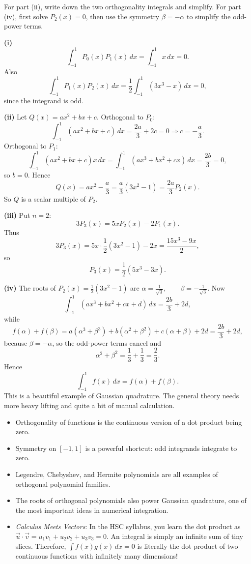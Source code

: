 \begin{hintbox}
For part (ii), write down the two orthogonality integrals and simplify. For part (iv), first solve $P_2(x)=0$, then use the symmetry $\beta=-\alpha$ to simplify the odd-power terms.
\end{hintbox}

\begin{solution}
\textbf{(i)} 
\[
\int_{-1}^{1}P_0(x)P_1(x)\,dx=\int_{-1}^{1}x\,dx=0.
\]
Also
\[
\int_{-1}^{1}P_1(x)P_2(x)\,dx
=\frac12\int_{-1}^{1}(3x^3-x)\,dx=0,
\]
since the integrand is odd.

\textbf{(ii)} Let $Q(x)=ax^2+bx+c$.
Orthogonal to $P_0$:
\[
\int_{-1}^{1}(ax^2+bx+c)\,dx=\frac{2a}{3}+2c=0
\Rightarrow c=-\frac{a}{3}.
\]
Orthogonal to $P_1$:
\[
\int_{-1}^{1}(ax^2+bx+c)x\,dx=\int_{-1}^{1}(ax^3+bx^2+cx)\,dx=\frac{2b}{3}=0,
\]
so $b=0$. Hence
\[
Q(x)=ax^2-\frac{a}{3}=\frac{a}{3}(3x^2-1)=\frac{2a}{3}P_2(x).
\]
So $Q$ is a scalar multiple of $P_2$.

\textbf{(iii)} Put $n=2$:
\[
3P_3(x)=5xP_2(x)-2P_1(x).
\]
Thus
\[
3P_3(x)=5x\cdot \frac12(3x^2-1)-2x=\frac{15x^3-9x}{2},
\]
so
\[
\boxed{P_3(x)=\frac12(5x^3-3x).}
\]

\textbf{(iv)} The roots of $P_2(x)=\frac12(3x^2-1)$ are 
$\alpha=\frac{1}{\sqrt3},\qquad \beta=-\frac{1}{\sqrt3}.$
Now
\[
\int_{-1}^{1}(ax^3+bx^2+cx+d)\,dx=\frac{2b}{3}+2d,
\]
while
\[
f(\alpha)+f(\beta)
=a(\alpha^3+\beta^3)+b(\alpha^2+\beta^2)+c(\alpha+\beta)+2d
=\frac{2b}{3}+2d,
\]
because $\beta=-\alpha$, so the odd-power terms cancel and
\[
\alpha^2+\beta^2=\frac13+\frac13=\frac23.
\]
Hence
\[
\boxed{\int_{-1}^{1} f(x)\,dx=f(\alpha)+f(\beta).}
\]
This is a beautiful example of Gaussian quadrature. The general theory needs more heavy lifting and quite a bit of manual calculation.
\end{solution}

\begin{takeaways}
\begin{itemize}[leftmargin=*]
\item Orthogonality of functions is the continuous version of a dot product being zero.
\item Symmetry on $[-1,1]$ is a powerful shortcut: odd integrands integrate to zero.
\item Legendre, Chebyshev, and Hermite polynomials are all examples of orthogonal polynomial families.
\item The roots of orthogonal polynomials also power Gaussian quadrature, one of the most important ideas in numerical integration.
\item \textit{Calculus Meets Vectors}: In the HSC syllabus, you learn the dot product as $\vec{u} \cdot \vec{v} = u_1v_1 + u_2v_2 + u_3v_3 = 0$. An integral is simply an infinite sum of tiny slices. Therefore, $\int f(x)g(x) \, dx = 0$ is literally the dot product of two continuous functions with infinitely many dimensions!
\end{itemize}
\end{takeaways}

